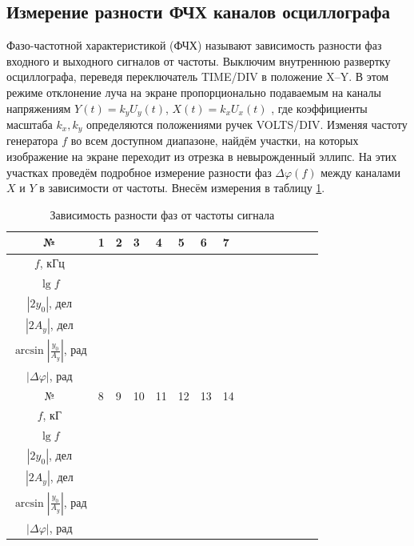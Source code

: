 \documentclass[a4paper,12pt]{article} %
\begin{document}
	\subsection{Измерение разности ФЧХ каналов осциллографа}
	
	Фазо-частотной характеристикой (ФЧХ) называют зависимость разности
	фаз входного и выходного сигналов от частоты.
	Выключим внутреннюю развертку осциллографа, переведя переключатель
	TIME/DIV в положение X–Y. В этом режиме отклонение луча на экране
	пропорционально подаваемым на каналы напряжениям $ Y\left(t\right)= k_yU_y\left(t\right) $,
	$ X\left(t\right) = k_xU_x\left(t\right) $ , где коэффициенты масштаба $ k_x, k_y $ определяются
	положениями ручек VOLTS/DIV. Изменяя частоту генератора $ f $ во всем
	доступном диапазоне, найдём участки, на которых изображение на экране
	переходит из отрезка в невырожденный эллипс. На этих участках проведём
	подробное измерение разности фаз $ \Delta \varphi\left(f\right) $ между каналами $ X $ и $ Y $ в
	зависимости от частоты. Внесём измерения в таблицу \ref{tab:fchkh}.
	
	\begin{table}[H]
		\centering
		\begin{tabular}{|c|p{1.2cm}|p{1.2cm}|p{1.2cm}|p{1.2cm}|p{1.2cm}|p{1.2cm}|p{1.2cm}| c|c|c|c|c|c|c|}
			\hline
			№ & 1 & 2 & 3 & 4 & 5 & 6 & 7 \\ \hline
			$ f $, кГц &  &  &  &  &  &  &  \\ \hline
			$ \lg f $ &  &  &  &  &  &  &  \\ \hline
			$ \left|2y_0\right| $, дел &  &  &  &  &  &  &  \\ \hline
			$ \left|2A_y\right| $, дел &  &  &  &  &  &  &  \\ \hline
			$ \arcsin\left|\frac{y_0}{A_y}\right| $, рад &  &  &  &  &  &  &  \\ \hline
			$ \left|\Delta\varphi\right| $, рад &  &  &  &  &  &  &  \\ \hline \hline
			№ & 8 & 9 & 10 & 11 & 12 & 13 & 14 \\ \hline
			$ f $, кГ &  &  &  &  &  &  &  \\ \hline
			$ \lg f $ &  &  &  &  &  &  &  \\ \hline
			$ \left|2y_0\right| $, дел &  &  &  &  &  &  &  \\ \hline
			$ \left|2A_y\right| $, дел &  &  &  &  &  &  &  \\ \hline
			$ \arcsin\left|\frac{y_0}{A_y}\right| $, рад &  &  &  &  &  &  &  \\ \hline
			$ \left|\Delta\varphi\right| $, рад &  &  &  &  &  &  &  \\ \hline 
		\end{tabular}
		\caption{Зависимость разности фаз от частоты сигнала}
		\label{tab:fchkh}
	\end{table}
	
\end{document}
